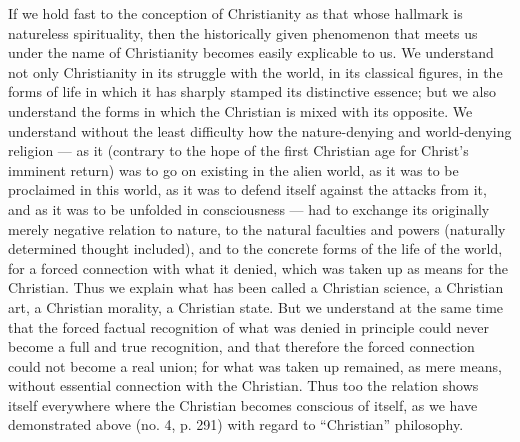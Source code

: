 \documentclass[12pt,a4paper,openany]{book}
\newcommand{\opage}[1]{\marginnote{\footnotesize\textit{[#1]}}}
\begin{document}
If we hold fast to the conception of Christianity as
that whose hallmark is natureless spirituality, then
the historically given phenomenon that meets us
under the name of Christianity becomes easily explicable to us. We understand
not only Christianity in its struggle with the world, in its
classical figures, in the forms of life in which it has sharply
stamped its distinctive essence; but we also understand the
forms in which the Christian is mixed with its opposite.
We understand without the least difficulty how the nature-denying
and world-denying religion --- as it
(contrary to the hope of the first Christian age for Christ's imminent
return) was to go on existing in the alien world,
as it was to be proclaimed in this world, as it was to
defend itself against the attacks from it, and as it was to be unfolded
in consciousness --- had to exchange its originally merely
negative relation to nature, to the natural faculties and
powers (naturally determined thought included), and to
the concrete forms of the life of the world, for a forced connection
with what it denied, which was taken up as means for the
Christian. Thus we explain what has been called a
Christian science, a Christian art, a Christian morality,
a Christian state. But we understand at the same time that the
forced factual recognition of what was denied in principle
could never become a full and true recognition, and that
therefore the forced connection could not become a real
union; for what was taken up remained, as mere means, without
essential connection with the Christian. Thus too
\opage{454}the relation shows itself everywhere where the Christian becomes conscious
of itself, as we have demonstrated above (no. 4, p. 291)
with regard to ``Christian'' philosophy.
\end{document}
